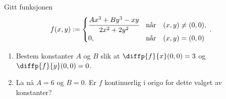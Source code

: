 \oppgave[V2010, Oppgave 3] Gitt funksjonen
%
\begin{equation*}
  f(x, y) :=
  \begin{cases}
    \cfrac{Ax^3 + By^3 - xy}{2x^2 + 2y^2} & \text{når} \quad (x,y) \neq (0,0), \\
    0, & \text{når} \quad (x,y) = (0,0)
  \end{cases}\,.
\end{equation*}
%
\begin{enumerate}
\item Bestem konstanter $A$ og $B$ slik at $\diffp{f}{x}(0,0) = 3$ og
$\diffp{f}{y}(0,0) = 0$. \medskip

\item La nå $A = 6$ og $B = 0$. Er $f$ kontinuerlig i origo for dette valget av konstanter?
\end{enumerate}

